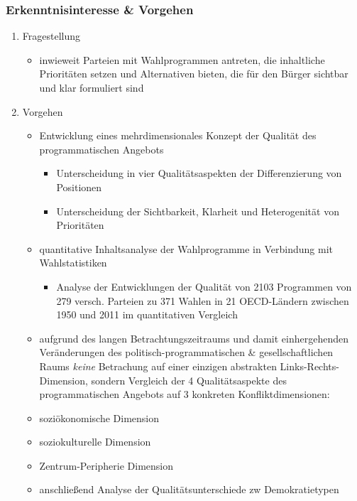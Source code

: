 \documentclass[11pt]{article}
\begin{document}
\subsubsection{Erkenntnisinteresse \& Vorgehen}
\label{sec:orgd966c0c}
\begin{enumerate}
\item Fragestellung
\label{sec:orge9ee1e1}
\begin{itemize}
\item inwieweit Parteien mit Wahlprogrammen antreten, die inhaltliche Prioritäten setzen und Alternativen bieten, die für den Bürger sichtbar und klar formuliert sind
\end{itemize}

\item Vorgehen
\label{sec:orgf1b8677}
\begin{itemize}
\item Entwicklung eines mehrdimensionales Konzept der Qualität des programmatischen Angebots
\begin{itemize}
\item Unterscheidung in vier Qualitätsaspekten der Differenzierung von Positionen
\item Unterscheidung der Sichtbarkeit, Klarheit und Heterogenität von Prioritäten
\end{itemize}
\item quantitative Inhaltsanalyse der Wahlprogramme in Verbindung mit Wahlstatistiken
\begin{itemize}
\item Analyse der Entwicklungen der Qualität von 2103 Programmen von 279 versch. Parteien zu 371 Wahlen in 21 OECD-Ländern zwischen 1950 und 2011 im quantitativen Vergleich
\end{itemize}
\item aufgrund des langen Betrachtungszeitraums und damit einhergehenden Veränderungen des politisch-programmatischen \& gesellschaftlichen Raums \emph{keine} Betrachung auf einer einzigen abstrakten Links-Rechts-Dimension, sondern Vergleich der 4 Qualitätsaspekte des programmatischen Angebots auf 3 konkreten Konfliktdimensionen:
\item soziökonomische Dimension
\item soziokulturelle Dimension
\item Zentrum-Peripherie Dimension

\item anschließend Analyse der Qualitätsunterschiede zw Demokratietypen
\end{itemize}
\end{enumerate}
\end{document}
